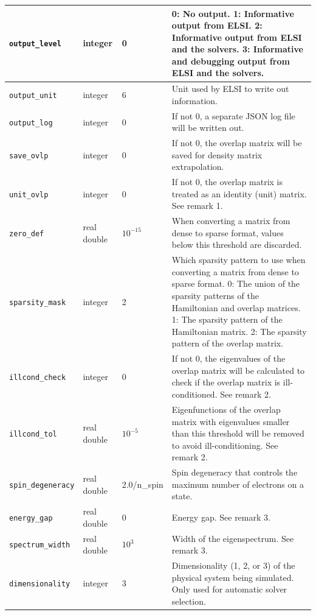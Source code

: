 \documentclass{report}
\begin{document}
\begin{longtable}[]{|p{30mm}|p{20mm}|p{15mm}|p{97mm}|}
\hline
\texttt{output\_level}       & integer          & 0           & 0: No output. 1: Informative output from ELSI. 2: Informative output from ELSI and the solvers. 3: Informative and debugging output from ELSI and the solvers.\\
\hline
\texttt{output\_unit}        & integer          & 6           & Unit used by ELSI to write out information.\\
\hline
\texttt{output\_log}         & integer          & 0           & If not 0, a separate JSON log file will be written out.\\
\hline
\texttt{save\_ovlp}          & integer          & 0           & If not 0, the overlap matrix will be saved for density matrix extrapolation.\\
\hline
\texttt{unit\_ovlp}          & integer          & 0           & If not 0, the overlap matrix is treated as an identity (unit) matrix. See remark 1.\\
\hline
\texttt{zero\_def}           & real double      & $10^{-15}$  & When converting a matrix from dense to sparse format, values below this threshold are discarded.\\
\hline
\texttt{sparsity\_mask}      & integer          & 2           & Which sparsity pattern to use when converting a matrix from dense to sparse format. 0: The union of the sparsity patterns of the Hamiltonian and overlap matrices. 1: The sparsity pattern of the Hamiltonian matrix. 2: The sparsity pattern of the overlap matrix.\\
\hline
\texttt{illcond\_check}      & integer          & 0           & If not 0, the eigenvalues of the overlap matrix will be calculated to check if the overlap matrix is ill-conditioned. See remark 2.\\
\hline
\texttt{illcond\_tol}        & real double      & $10^{-5}$   & Eigenfunctions of the overlap matrix with eigenvalues smaller than this threshold will be removed to avoid ill-conditioning. See remark 2.\\
\hline
\texttt{spin\_degeneracy}    & real double      & 2.0/n\_spin & Spin degeneracy that controls the maximum number of electrons on a state.\\
\hline
\texttt{energy\_gap}         & real double      & 0           & Energy gap. See remark 3.\\
\hline
\texttt{spectrum\_width}     & real double      & $10^{3}$    & Width of the eigenspectrum. See remark 3.\\
\hline
\texttt{dimensionality}      & integer          & 3           & Dimensionality (1, 2, or 3) of the physical system being simulated. Only used for automatic solver selection.\\

\end{longtable}
\end{document}
